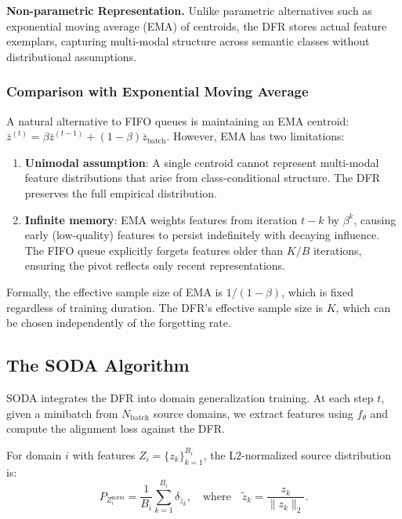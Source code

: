 \textbf{Non-parametric Representation.} Unlike parametric alternatives such as exponential moving average (EMA) of centroids, the DFR stores actual feature exemplars, capturing multi-modal structure across semantic classes without distributional assumptions.

\subsubsection{Comparison with Exponential Moving Average}

A natural alternative to FIFO queues is maintaining an EMA centroid: $\bar{z}^{(t)} = \beta \bar{z}^{(t-1)} + (1-\beta) \bar{z}_{\text{batch}}$. However, EMA has two limitations:

\begin{enumerate}
    \item \textbf{Unimodal assumption}: A single centroid cannot represent multi-modal feature distributions that arise from class-conditional structure. The DFR preserves the full empirical distribution.
    
    \item \textbf{Infinite memory}: EMA weights features from iteration $t-k$ by $\beta^k$, causing early (low-quality) features to persist indefinitely with decaying influence. The FIFO queue explicitly forgets features older than $K/B$ iterations, ensuring the pivot reflects only recent representations.
\end{enumerate}

Formally, the effective sample size of EMA is $1/(1-\beta)$, which is fixed regardless of training duration. The DFR's effective sample size is $K$, which can be chosen independently of the forgetting rate.

\subsection{The SODA Algorithm}
\label{ssec:soda_algorithm}

SODA integrates the DFR into domain generalization training. At each step $t$, given a minibatch from $N_{\text{batch}}$ source domains, we extract features using $f_\theta$ and compute the alignment loss against the DFR.

For domain $i$ with features $Z_i = \{z_k\}_{k=1}^{B_i}$, the L2-normalized source distribution is:
\begin{equation}
    P_{Z_i^{\text{norm}}} = \frac{1}{B_i} \sum_{k=1}^{B_i} \delta_{\tilde{z}_k}, \quad \text{where} \quad \tilde{z}_k = \frac{z_k}{\|z_k\|_2}.
\end{equation}

